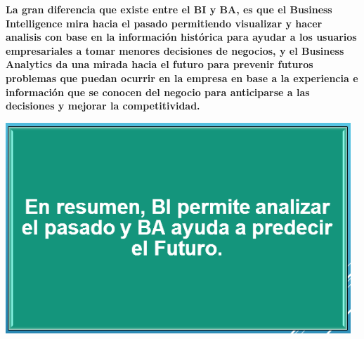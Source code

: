 \begin{flushleft}
\begin{center}
\end{center}
\item
\item
\textbf{La gran  diferencia que existe entre el BI y BA, es que el Business Intelligence mira  hacia el pasado permitiendo visualizar y hacer analisis con base  en la información histórica para  ayudar a los usuarios empresariales a tomar menores decisiones de negocios, y el Business Analytics da una mirada hacia el futuro para  prevenir futuros problemas que puedan ocurrir en la empresa en  base  a la  experiencia e información  que  se  conocen del  negocio  para anticiparse a las decisiones y mejorar la competitividad.}

\item
\begin{center}
\includegraphics[width=13cm]{./Imagenes/image05}
\end{center}
\item


\end{flushleft}
